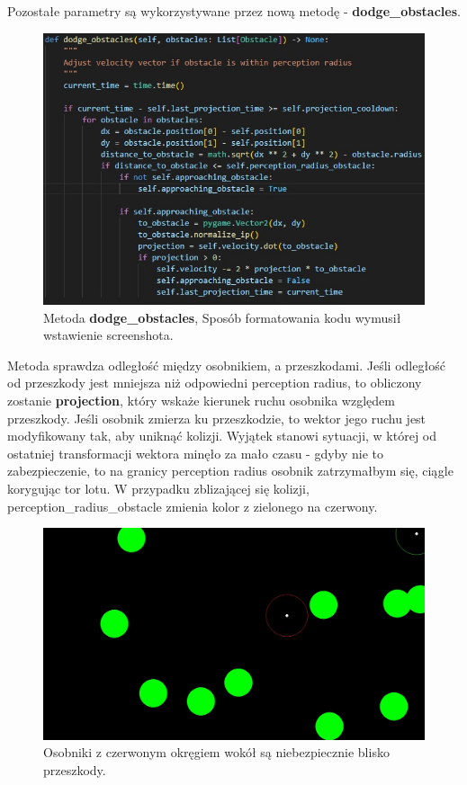 \documentclass[12pt,a4paper,table]{article}
\begin{document}
    Pozostałe parametry są wykorzystywane przez nową metodę - \textbf{dodge\_obstacles}.

    \begin{figure}[H]
        \centering
        \includegraphics[width=1\textwidth]{images/kod1.jpg}
        \caption{Metoda \textbf{dodge\_obstacles}, Sposób formatowania kodu wymusił wstawienie screenshota.}
        \label{fig:example}
    \end{figure}

    Metoda sprawdza odległość między osobnikiem, a przeszkodami. Jeśli odległość od przeszkody jest mniejsza niż odpowiedni perception radius, to obliczony zostanie \textbf{projection}, który wskaże kierunek ruchu osobnika względem przeszkody. Jeśli osobnik zmierza ku przeszkodzie, to wektor jego ruchu jest modyfikowany tak, aby uniknąć kolizji.
    Wyjątek stanowi sytuacji, w której od ostatniej transformacji wektora minęło za mało czasu - gdyby nie to zabezpieczenie, to na granicy perception radius osobnik zatrzymałbym się, ciągle korygując tor lotu.
    W przypadku zblizającej się kolizji, perception\_radius\_obstacle zmienia kolor z zielonego na czerwony.

    \begin{figure}[H]
        \centering
        \includegraphics[width=1\textwidth]{images/perception_radius2.jpg}
        \caption{Osobniki z czerwonym okręgiem wokół są niebezpiecznie blisko przeszkody.}
        \label{fig:example}
    \end{figure}
\end{document}
